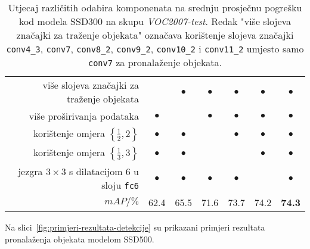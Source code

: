 \documentclass[utf8, diplomski, numeric, lmodern]{fer}
\begin{document}
\begin{table}
	\centering
	\begin{tabular}{|r|cccccc|}
		\hline
		više slojeva značajki za traženje objekata & & $\bullet$ & $\bullet$ & $\bullet$ & $\bullet$ & $\bullet$ \\
		više proširivanja podataka & $\bullet$ & & $\bullet$ & $\bullet$ & $\bullet$ & $\bullet$ \\
		korištenje omjera $\left\{\frac{1}{2},2\right\}$ & $\bullet$ & $\bullet$ & & $\bullet$ & $\bullet$ & $\bullet$ \\
		korištenje omjera $\left\{\frac{1}{3},3\right\}$ & $\bullet$ & $\bullet$ & & & $\bullet$ & $\bullet$ \\
		jezgra $3\times 3$ s dilatacijom 6 u sloju \texttt{fc6} & $\bullet$ & $\bullet$ & $\bullet$ & $\bullet$ & & $\bullet$ \\
		\hline
		$\textit{mAP}/\%$ & 62.4 & 65.5 & 71.6 & 73.7 & 74.2 & \textbf{74.3} \\
		\hline
	\end{tabular}
	\caption{Utjecaj različitih odabira komponenata na srednju prosječnu pogrešku kod modela SSD300 na skupu \emph{VOC2007-test}. Redak "više slojeva značajki za traženje objekata" označava korištenje slojeva značajki \texttt{conv4\_3}, \texttt{conv7}, \texttt{conv8\_2}, \texttt{conv9\_2}, \texttt{conv10\_2} i \texttt{conv11\_2} umjesto samo \texttt{conv7} za pronalaženje objekata.}
	\label{tab:kanaliza-komponenata}
\end{table}

Na slici~\ref{fig:primjeri-rezultata-detekcije} su prikazani primjeri rezultata pronalaženja objekata modelom SSD500.
\end{document}
